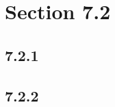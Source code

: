 





\section*{Section 7.2}

\subsection*{7.2.1}
\begin{enumerate}
\end{enumerate}

\subsection*{7.2.2}
\begin{enumerate}
\end{enumerate}

